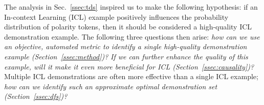\begin{comment}
We first introduce the challenges of using base LLMs as assistants that can understand instructions and generate human-preferred answers (Sec.~\ref{ssec:backround}).
In Sec.~\ref{ssec:baseline}, we first introduce baseline methods that can elicit untuned LLMs to start and end answering user queries\ar{suggested rewrite: induce even untuned LLMs to answer user queries}.
Then, in Sec.~\ref{ssec:icil}, we introduce in-context learning methods that use a few input-output pairs as demonstrations for base LLMs to learn to infer the response to a given query.
Finally, in Sec.~\ref{ssec:icalign}, we present a follow-up alignment stage via in-context learning that can further refine initial responses to become more human-preferred.
\end{comment}


The analysis in Sec.~\ref{ssec:tds} inspired us to make the following hypothesis: if an In-context Learning (ICL) example positively influences the probability distribution of polarity tokens, then it should be considered a high-quality ICL demonstration example.
The following three questions then arise: \textit{how can we use an objective, automated metric to identify a single high-quality demonstration example (Section~\ref{ssec:method})?} 
\textit{If we can further enhance the quality of this example, will it make it even more beneficial for ICL (Section~\ref{ssec:causality})?} 
Multiple ICL demonstrations are often more effective than a single ICL example; \textit{how can we identify such an approximate optimal demonstration set (Section~\ref{ssec:dfs})?}

